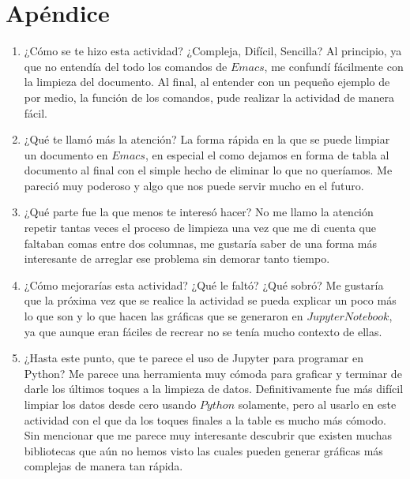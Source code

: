 \documentclass{article}
\begin{document}
\section{Apéndice}
\begin{enumerate}
\item ¿Cómo se te hizo esta actividad? ¿Compleja, Difícil, Sencilla?
Al principio, ya que no entendía del todo los comandos de $Emacs$, me confundí fácilmente con la limpieza del documento. Al final, al entender con un pequeño ejemplo de por medio, la función de los comandos, pude realizar la actividad de manera fácil.

\item¿Qué te llamó más la atención?
La forma rápida en la que se puede limpiar un documento en $Emacs$, en especial el como dejamos en forma de tabla al documento al final con el simple hecho de eliminar lo que no queríamos. Me pareció muy poderoso y algo que nos puede servir mucho en el futuro.

\item¿Qué parte fue la que menos te interesó hacer?
No me llamo la atención repetir tantas veces el proceso de limpieza una vez que me di cuenta que faltaban comas entre dos columnas, me gustaría saber de una forma más interesante de arreglar ese problema sin demorar tanto tiempo.

\item¿Cómo mejorarías esta actividad? ¿Qué le faltó? ¿Qué sobró?
Me gustaría que la próxima vez que se realice la actividad se pueda explicar un poco más lo que son y lo que hacen las gráficas que se generaron en $Jupyter Notebook$, ya que aunque eran fáciles de recrear no se tenía mucho contexto de ellas. 

\item¿Hasta este punto, que te parece el uso de Jupyter para programar en Python? 
Me parece una herramienta muy cómoda para graficar y terminar de darle los últimos toques a la limpieza de datos. Definitivamente fue más difícil limpiar los datos desde cero usando $Python$ solamente, pero al usarlo en este actividad con el que da los toques finales a la table es mucho más cómodo. Sin mencionar que me parece muy interesante descubrir que existen muchas bibliotecas que aún no hemos visto las cuales pueden generar gráficas más complejas de manera tan rápida.

\end{enumerate}
\end{document}
